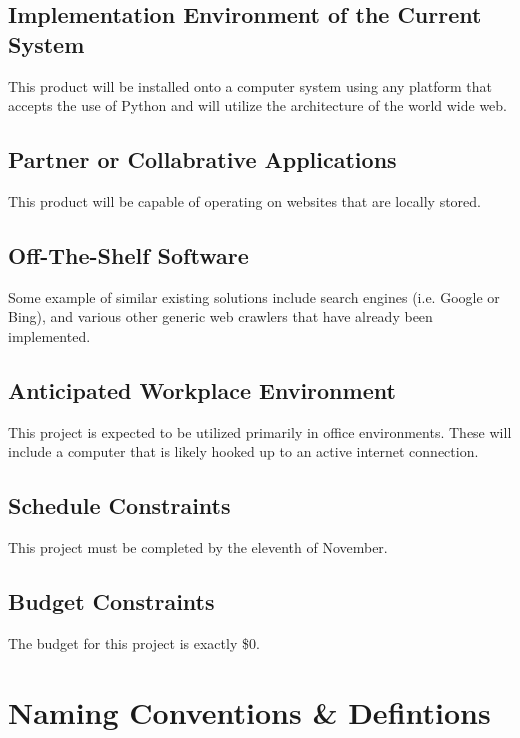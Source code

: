 \documentclass[titlepage]{article}
\begin{document}
\subsection*{Implementation Environment of the Current System}
This product will be installed onto a computer system using any platform that accepts the use of Python and will utilize the architecture of the world wide web.

\subsection*{Partner or Collabrative Applications}
This product will be capable of operating on websites that are locally stored.

\subsection*{Off-The-Shelf Software}
Some example of similar existing solutions include search engines (i.e. Google or Bing), and various other generic web crawlers that have already been implemented.

\subsection*{Anticipated Workplace Environment}
This project is expected to be utilized primarily in office environments. These will include a computer that is likely hooked up to an active internet connection.

\subsection*{Schedule Constraints}
This project must be completed by the eleventh of November.

\subsection*{Budget Constraints}
The budget for this project is exactly \$0.


\section{Naming Conventions \& Defintions}
\end{document}
